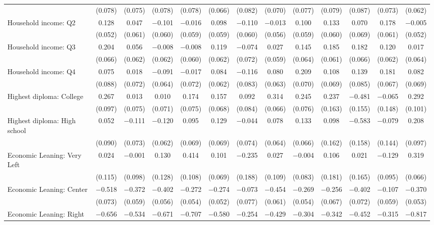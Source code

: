 \begin{tabular}{@{\extracolsep{5pt}}lcccccccccccc}
  & (0.078) & (0.075) & (0.078) & (0.078) & (0.066) & (0.082) & (0.070) & (0.077) & (0.079) & (0.087) & (0.073) & (0.062) \\ 
  Household income: Q2 & 0.128 & 0.047 & $-$0.101 & $-$0.016 & 0.098 & $-$0.110 & $-$0.013 & 0.100 & 0.133 & 0.070 & 0.178 & $-$0.005 \\ 
  & (0.052) & (0.061) & (0.060) & (0.059) & (0.059) & (0.060) & (0.056) & (0.059) & (0.060) & (0.069) & (0.061) & (0.052) \\ 
  Household income: Q3 & 0.204 & 0.056 & $-$0.008 & $-$0.008 & 0.119 & $-$0.074 & 0.027 & 0.145 & 0.185 & 0.182 & 0.120 & 0.017 \\ 
  & (0.066) & (0.062) & (0.062) & (0.060) & (0.062) & (0.072) & (0.059) & (0.064) & (0.061) & (0.066) & (0.062) & (0.064) \\ 
  Household income: Q4 & 0.075 & 0.018 & $-$0.091 & $-$0.017 & 0.084 & $-$0.116 & 0.080 & 0.209 & 0.108 & 0.139 & 0.181 & 0.082 \\ 
  & (0.088) & (0.072) & (0.064) & (0.072) & (0.062) & (0.083) & (0.063) & (0.070) & (0.069) & (0.085) & (0.067) & (0.069) \\ 
  Highest diploma: College & 0.267 & 0.013 & 0.010 & 0.174 & 0.157 & 0.092 & 0.314 & 0.245 & 0.237 & $-$0.481 & $-$0.065 & 0.292 \\ 
  & (0.097) & (0.075) & (0.071) & (0.075) & (0.068) & (0.084) & (0.066) & (0.076) & (0.163) & (0.155) & (0.148) & (0.101) \\ 
  Highest diploma: High school & 0.052 & $-$0.111 & $-$0.120 & 0.095 & 0.129 & $-$0.044 & 0.078 & 0.133 & 0.098 & $-$0.583 & $-$0.079 & 0.208 \\ 
  & (0.090) & (0.073) & (0.062) & (0.069) & (0.069) & (0.074) & (0.064) & (0.066) & (0.162) & (0.158) & (0.144) & (0.097) \\ 
  Economic Leaning: Very Left & 0.024 & $-$0.001 & 0.130 & 0.414 & 0.101 & $-$0.235 & 0.027 & $-$0.004 & 0.106 & 0.021 & $-$0.129 & 0.319 \\ 
  & (0.115) & (0.098) & (0.128) & (0.108) & (0.069) & (0.188) & (0.109) & (0.083) & (0.181) & (0.165) & (0.095) & (0.066) \\ 
  Economic Leaning: Center & $-$0.518 & $-$0.372 & $-$0.402 & $-$0.272 & $-$0.274 & $-$0.073 & $-$0.454 & $-$0.269 & $-$0.256 & $-$0.402 & $-$0.107 & $-$0.370 \\ 
  & (0.073) & (0.059) & (0.056) & (0.054) & (0.052) & (0.077) & (0.061) & (0.054) & (0.067) & (0.072) & (0.059) & (0.053) \\ 
  Economic Leaning: Right & $-$0.656 & $-$0.534 & $-$0.671 & $-$0.707 & $-$0.580 & $-$0.254 & $-$0.429 & $-$0.304 & $-$0.342 & $-$0.452 & $-$0.315 & $-$0.817 \\ 

\end{tabular}
